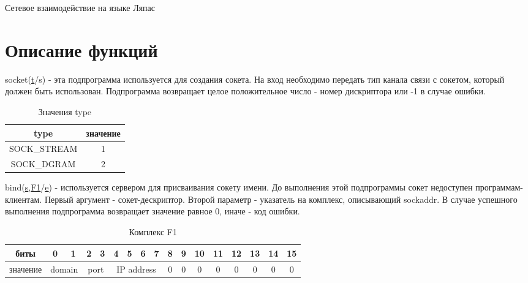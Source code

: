 \documentclass[12t,english,russian]{article}
\begin{document}
\huge
\begin{center}
{Сетевое взаимодействие на языке Ляпас}
\end{center}
\Large
\tableofcontents
\newpage

\large
\section[Описание функций]{Описание функций}
\label{socket}
\hspace{\parindent}
socket(\hyperref[type]{t}/s) - эта подпрограмма используется для создания сокета. На вход необходимо передать тип канала связи с сокетом, который должен быть использован. Подпрограмма возвращает целое положительное число - номер дискриптора или -1 в случае ошибки.

\begin{table}[ht]
\caption{\label{type}Значения type}
\begin{center}
\begin{tabular}{|c|c|}
\hline
type & значение \\
\hline
SOCK\_STREAM & 1 \\
SOCK\_DGRAM & 2 \\
\hline
\end{tabular}
\end{center}
\end{table}

\label{bind}
bind(\hyperref[socket]{s},\hyperref[sockaddr]{F1}/\hyperref[error]{e}) - используется сервером для присваивания сокету имени. До выполнения этой подпрограммы сокет недоступен программам-клиентам. Первый аргумент - сокет-дескриптор. Второй параметр - указатель на комплекс, описывающий sockaddr. В случае успешного выполнения подпрограмма возвращает значение равное 0, иначе - код ошибки.

\begin{table}[H]
\caption{\label{sockaddr}Комплекс F1}
\begin{center}
\begin{tabular}{|c|c|c|c|c|c|c|c|c|c|c|c|c|c|c|c|c|}
\hline
биты & 0 & 1 & 2 & 3 & 4 & 5 & 6 & 7 & 8 & 9 & 10 & 11 & 12 & 13 & 14 & 15 \\
\hline
значение & \multicolumn{2}{|c|}{domain} & \multicolumn{2}{|c|}{port} & \multicolumn{4}{|c|}{IP address} & 0 & 0 & 0 & 0 & 0 & 0 & 0 & 0 \\
\hline
\end{tabular}
\end{center}
\end{table}
\end{document}
